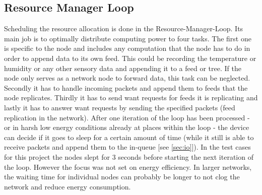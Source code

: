 \subsection{Resource Manager Loop}
Scheduling the resource allocation is done in the Resource-Manager-Loop. Its main job is to optimally distribute computing power to four tasks. The first one is specific to the node and includes any computation that the node has to do in order to append data to its own feed. This could be recording the temperature or humidity or any other sensory data and appending it to a feed or tree. If the node only serves as a network node to forward data, this task can be neglected. Secondly it has to handle incoming packets and append them to feeds that the node replicates. Thirdly it has to send want requests for feeds it is replicating and lastly it has to answer want requests by sending the specified packets (feed replication in the network). After one iteration of the loop has been processed - or in harsh low energy conditions already at places within the loop - the device can decide if it goes to sleep for a certain amount of time (while it still is able to receive packets and append them to the in-queue [see \cref{sec:io}]). In the test cases for this project the nodes slept for 3 seconds before starting the next iteration of the loop. However the focus was not set on energy efficiency. In larger networks, the waiting time for individual nodes can probably be longer to not clog the network and reduce energy consumption.

